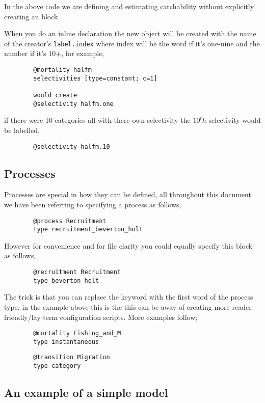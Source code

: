 In the above code we are defining and estimating catchability without explicitly creating an  block.

When you do an inline declaration the new object will be created with the name of the creator's \texttt{label.index} where index will be the word if it's one-nine and the number if it's 10+, for example,
{\small{\begin{verbatim}
		@mortality halfm
		selectivities [type=constant; c=1]
		
		would create
		@selectivity halfm.one
		\end{verbatim}}}

if there were 10 categories all with there own selectivity the $10^th$ selectivity would be labelled,

{\small{\begin{verbatim}
		@selectivity halfm.10
		\end{verbatim}}}


\subsection{Processes}
Processes are special in how they can be defined, all throughout this document we have been referring to specifying a process as follows,

{\small{\begin{verbatim}
		@process Recruitment
		type recruitment_beverton_holt
		\end{verbatim}}}
However for convenience and for file clarity you could equally specify this block as follows,
{\small{\begin{verbatim}
		@recruitment Recruitment
		type beverton_holt
		\end{verbatim}}}

The trick is that you can replace the keyword  with the first word of the process type, in the example above this is the  this can be away of creating more reader friendly/lay term configuration scripts. More examples follow;

{\small{\begin{verbatim}
		@mortality Fishing_and_M
		type instantaneous
		\end{verbatim}}}

{\small{\begin{verbatim}
		@transition Migration
		type category
		\end{verbatim}}}
	
\subsection{An example of a simple model\label{example1}}




%

